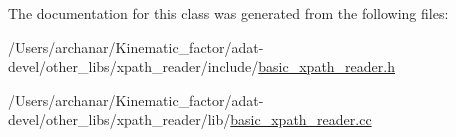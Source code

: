 The documentation for this class was generated from the following files\+:\begin{DoxyCompactItemize}
\item 
/\+Users/archanar/\+Kinematic\+\_\+factor/adat-\/devel/other\+\_\+libs/xpath\+\_\+reader/include/\mbox{\hyperlink{adat-devel_2other__libs_2xpath__reader_2include_2basic__xpath__reader_8h}{basic\+\_\+xpath\+\_\+reader.\+h}}\item 
/\+Users/archanar/\+Kinematic\+\_\+factor/adat-\/devel/other\+\_\+libs/xpath\+\_\+reader/lib/\mbox{\hyperlink{adat-devel_2other__libs_2xpath__reader_2lib_2basic__xpath__reader_8cc}{basic\+\_\+xpath\+\_\+reader.\+cc}}\end{DoxyCompactItemize}
